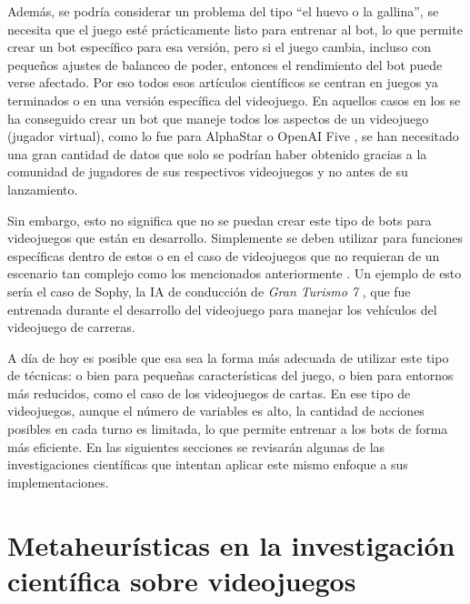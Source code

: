 Además, se podría considerar un problema del tipo ``el huevo o la gallina'', se necesita que el juego esté prácticamente listo para entrenar al bot, lo que permite crear un bot específico para esa versión, pero si el juego cambia, incluso con pequeños ajustes de balanceo de poder, entonces el rendimiento del bot puede verse afectado. Por eso todos esos artículos científicos se centran en juegos ya terminados o en una versión específica del videojuego. En aquellos casos en los se ha conseguido crear un bot que maneje todos los aspectos de un videojuego (jugador virtual), como lo fue para AlphaStar \cite{vinyals_grandmaster_2019} o OpenAI Five \cite{openai_dota_2019}, se han necesitado una gran cantidad de datos que solo se podrían haber obtenido gracias a la comunidad de jugadores de sus respectivos videojuegos y no antes de su lanzamiento.

Sin embargo, esto no significa que no se puedan crear este tipo de bots para videojuegos que están en desarrollo. Simplemente se deben utilizar para funciones específicas dentro de estos o en el caso de videojuegos que no requieran de un escenario tan complejo como los mencionados anteriormente \cite{ai_and_games_why_2024}. Un ejemplo de esto sería el caso de Sophy, la IA de conducción de \textit{Gran Turismo 7} \cite{wurman_outracing_2022}, que fue entrenada durante el desarrollo del videojuego para manejar los vehículos del videojuego de carreras.

A día de hoy es posible que esa sea la forma más adecuada de utilizar este tipo de técnicas: o bien para pequeñas características del juego, o bien para entornos más reducidos, como el caso de los videojuegos de cartas. En ese tipo de videojuegos, aunque el número de variables es alto, la cantidad de acciones posibles en cada turno es limitada, lo que permite entrenar a los bots de forma más eficiente. En las siguientes secciones se revisarán algunas de las investigaciones científicas que intentan aplicar este mismo enfoque a sus implementaciones.

\section{Metaheurísticas en la investigación científica sobre videojuegos} \label{sec:estado_arte}



